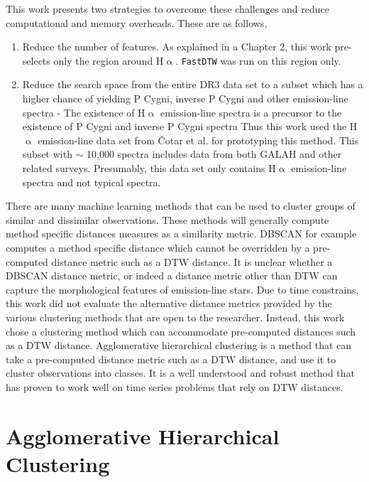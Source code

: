 This work presents two strategies to overcome these challenges and reduce computational and memory overheads. These are as follows,

\begin{enumerate}
    \item Reduce the number of features. As explained in a Chapter 2, this work pre-selects only the region around H$\upalpha$. \texttt{FastDTW} was run on this region only.
    \item Reduce the search space from the entire DR3 data set to a subset which has a higher chance of yielding P Cygni, inverse P Cygni and other emission-line spectra - The existence of H$\upalpha$ emission-line spectra is a precursor to the existence of P Cygni and inverse P Cygni spectra Thus this work used the H$\upalpha$ emission-line data set from Čotar et al.\cite{vcotar2021galah} for prototyping this method. This subset with $\sim$ 10,000 spectra includes data from both GALAH and other related surveys. Presumably, this data set only contains H$\upalpha$ emission-line spectra and not typical spectra.
\end{enumerate}

There are many machine learning methods that can be used to cluster groups of similar and dissimilar observations. These methods will generally compute method specific distances measures as a similarity metric. DBSCAN for example computes a method specific distance which cannot be overridden by a pre-computed distance metric such as a DTW distance\cite{traven2017galah}. It is unclear whether a DBSCAN distance metric, or indeed a distance metric other than DTW can capture the morphological features of emission-line stars. Due to time constrains, this work did not evaluate the alternative distance metrics provided by the various clustering methods that are open to the researcher. Instead, this work chose a clustering method which can accommodate pre-computed distances such as a DTW distance. Agglomerative hierarchical clustering is a method that can take a pre-computed distance metric such as a DTW distance, and use it to cluster observations into classes. It is a well understood and robust method that has proven to work well on time series problems that rely on DTW distances\cite{nielsen2019practical}.

\section{Agglomerative Hierarchical Clustering}

